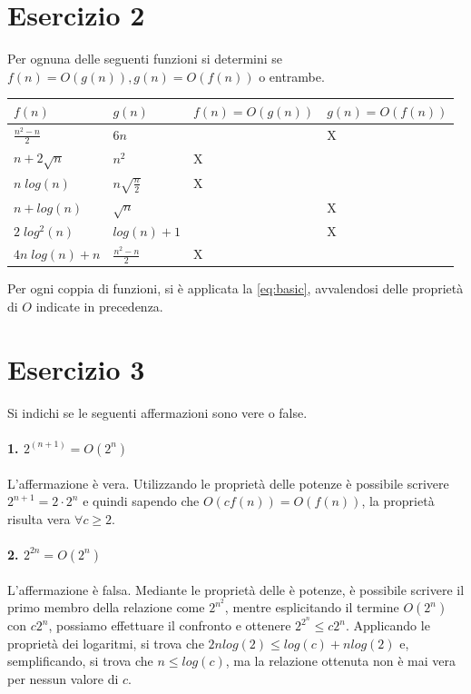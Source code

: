 \documentclass{article}
\begin{document}
\section{Esercizio 2}

Per ognuna delle seguenti funzioni si determini se $f(n) = O(g(n)), g(n) = O(f(n))$ o entrambe.

\begin{center}
    \begin{tabular}{ | C{2.8cm} | C{2.8cm} | C{2.4cm} | C{2.4cm} |}
        \hline
        $f(n)$ & $g(n)$ & $f(n) = O(g(n))$ &  $g(n) = O(f(n))$ \\ [2ex] 
        \hline\hline
        $\frac{n^2-n}{2}$ & $6n$ &  & X \\  [2ex] 
        \hline
        $n+2\sqrt{n}$ & $n^2$ & X &  \\  [2ex] 
        \hline
        $n\;log(n)$ & $n\sqrt{\frac{n}{2}}$ & X &  \\  [2ex] 
        \hline
        $n + log(n)$ & $\sqrt{n} $ &  & X \\  [2ex] 
        \hline
        $2\;log^2(n)$ & $log(n) + 1 $ &  & X \\  [2ex] 
        \hline
        $4n\;log(n)+n$ & $\frac{n^2-n}{2}$ & X &  \\ [2ex] 
        \hline
    \end{tabular}
\end{center}

Per ogni coppia di funzioni, si è applicata la \cref{eq:basic}, avvalendosi delle proprietà di $O$ indicate in precedenza.

\section{Esercizio 3}
Si indichi se le seguenti affermazioni sono vere o false.

\paragraph{1. $2^{(n+1)} = O(2^n)$} L'affermazione è vera. Utilizzando le proprietà delle potenze è possibile scrivere $2^{n+1} = 2\cdot2^n$ e quindi sapendo che $O(c f(n)) = O(f(n))$, la proprietà risulta vera $\forall c\geq2$.

\paragraph{2. $2^{2n} = O(2^n)$} L'affermazione è falsa. Mediante le proprietà delle è potenze, è possibile scrivere il primo membro della relazione come $2^{n^2}$, mentre esplicitando il termine $O(2^n)$ con $c2^n$, possiamo effettuare il confronto e ottenere $2^{2^n} \leq c2^n$. Applicando le proprietà dei logaritmi, si trova che $2n log(2) \leq log(c) + n log(2)$ e, semplificando, si trova che $n \leq log(c)$, ma la relazione ottenuta non è mai vera per nessun valore di $c$.
\end{document}
